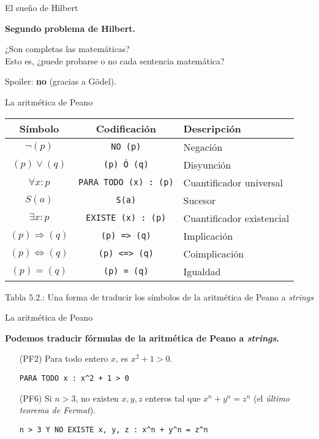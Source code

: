 \documentclass[10pt,xcolor=dvipsnames,aspectratio=169,spanish]{beamer}
\begin{document}
\begin{frame}{El sueño de Hilbert}

\textbf{Segundo problema de Hilbert.}

¿Son completas las matemáticas? \\ Esto es, ¿puede probarse o no cada sentencia matemática?

\vspace{5mm}

\pause

Spoiler: \textbf{no} (gracias a Gödel).

\end{frame}


\begin{frame}{La aritmética de Peano}

\begin{table}[H]
\centering
\begin{tabular}{@{}ccl@{}}
\toprule
Símbolo & Codificación & Descripción \\ \midrule
$\neg(p)$ & \texttt{NO (p)} & Negación \\
$(p) \vee (q)$ & \texttt{(p) Ó (q)} & Disyunción \\
$\forall x : p$ & \texttt{PARA TODO (x) : (p)} & Cuantificador universal \\
$S(a)$ & \texttt{S(a)} & Sucesor \\
$\exists x : p$ & \texttt{EXISTE (x) : (p)} & Cuantificador existencial \\
$(p) \Rightarrow (q)$ & \texttt{(p)}\texttt{ }\texttt{=>}\texttt{ }\texttt{(q)} & Implicación \\
$(p) \iff (q)$ & \texttt{(p)}\texttt{ }\texttt{<=>}\texttt{ }\texttt{(q)} & Coimplicación \\
$(p)=(q)$ & \texttt{(p) = (q)} & Igualdad \\\bottomrule
\end{tabular}
\end{table}
\begin{center}
{\small Tabla 5.2.: Una forma de traducir los símbolos de la aritmética de Peano a \emph{strings}}
\end{center}

\end{frame}

\begin{frame}{La aritmética de Peano}

\textbf{Podemos traducir fórmulas de la aritmética de Peano a \emph{strings}.}

\begin{itemize}
    \item[(PF2)] Para todo entero $x$, es $x^2+1>0$.

    \texttt{PARA TODO x : x{\^{}}2 + 1 > 0}

    \item[(PF6)] Si $n>3$, no existen $x,y,z$ enteros tal que $x^n+y^n=z^n$ (el \emph{último teorema de Fermat}).

    \texttt{n > 3 Y NO EXISTE x, y, z : x{\^{}}n + y{\^{}}n = z{\^{}}n}
\end{itemize}

\end{frame}
\end{document}
